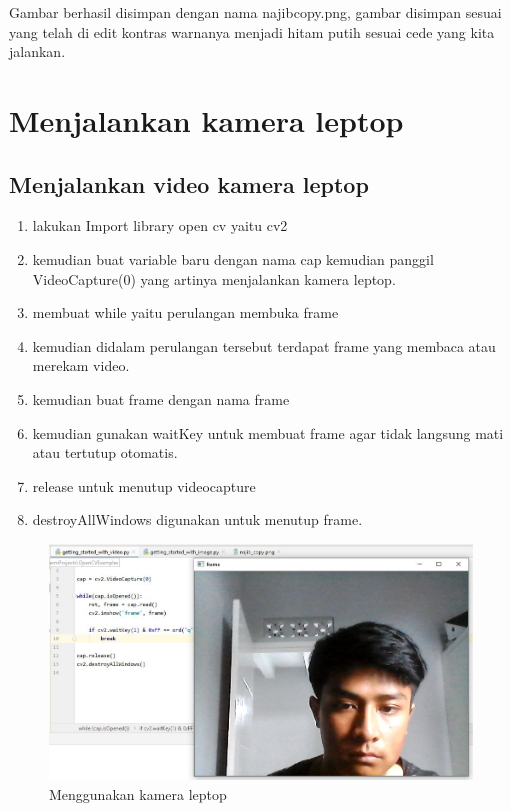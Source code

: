 Gambar berhasil disimpan dengan nama najibcopy.png, gambar disimpan sesuai yang telah di edit kontras warnanya menjadi hitam putih sesuai cede yang kita jalankan.

\newpage
\section{Menjalankan kamera leptop}
\subsection{Menjalankan video kamera leptop}

\begin{enumerate}
	\item lakukan Import library open cv yaitu cv2
	\item kemudian buat variable baru dengan nama cap kemudian panggil VideoCapture(0) yang artinya menjalankan kamera leptop.
	\item membuat while yaitu perulangan membuka frame
	\item kemudian didalam perulangan tersebut terdapat frame yang membaca atau merekam video.
	\item kemudian buat frame dengan nama frame
	\item kemudian gunakan waitKey untuk membuat frame agar tidak langsung mati atau tertutup otomatis.
	\item release untuk menutup videocapture
	\item destroyAllWindows digunakan untuk menutup frame.
\end{enumerate}

\newpage
\begin{figure}[ht]
\centering
\includegraphics[scale=0.5]{figures/2,4.jpg}
\caption{Menggunakan kamera leptop}
\label{contoh}
\end{figure}

